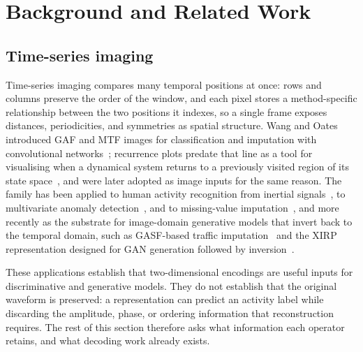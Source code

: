 \documentclass[preprint,12pt]{elsarticle}
\begin{document}
\section{Background and Related Work}\label{sec:related_encodings}

\subsection{Time-series imaging}
Time-series imaging compares many temporal positions at once: rows and columns preserve the order of the window, and each pixel stores a method-specific relationship between the two positions it indexes, so a single frame exposes distances, periodicities, and symmetries as spatial structure. Wang and Oates introduced GAF and MTF images for classification and imputation with convolutional networks~\cite{wang2015encoding,wang2015encoding2}; recurrence plots predate that line as a tool for visualising when a dynamical system returns to a previously visited region of its state space~\cite{eckmann1987recurrence,marwan2007recurrence}, and were later adopted as image inputs for the same reason. The family has been applied to human activity recognition from inertial signals~\cite{ahmad2021inertial}, to multivariate anomaly detection~\cite{ma2024anomaly}, and to missing-value imputation~\cite{huamin2020reconstruction}, and more recently as the substrate for image-domain generative models that invert back to the temporal domain, such as GASF-based traffic imputation~\cite{huang2023tsdigan} and the XIRP representation designed for GAN generation followed by inversion~\cite{hellermann2026imagegan}.

These applications establish that two-dimensional encodings are useful inputs for discriminative and generative models. They do not establish that the original waveform is preserved: a representation can predict an activity label while discarding the amplitude, phase, or ordering information that reconstruction requires. The rest of this section therefore asks what information each operator retains, and what decoding work already exists.
\end{document}
